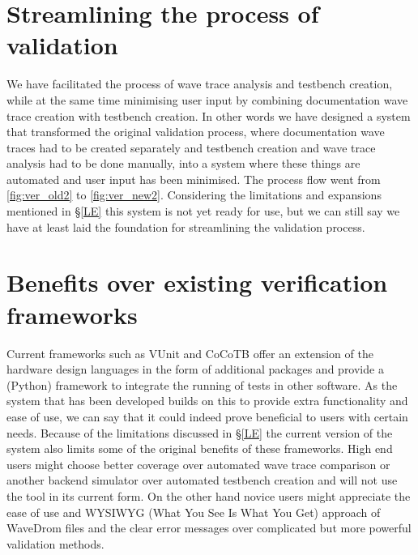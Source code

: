 \section{Streamlining the process of validation}
We have facilitated the process of wave trace analysis and testbench creation, while at the same time minimising user input by combining documentation wave trace creation with testbench creation. In other words we have designed a system that transformed the original validation process, where documentation wave traces had to be created separately and testbench creation and wave trace analysis had to be done manually, into a system where these things are automated and user input has been minimised. The process flow went from \ref{fig:ver_old2} to \ref{fig:ver_new2}.
\npar
Considering the limitations and expansions mentioned in §\ref{LE} this system is not yet ready for use, but we can still say we have at least laid the foundation for streamlining the validation process.\newpage%
%
\npar
{}%
\restoregeometry
\section{Benefits over existing verification frameworks}
Current frameworks such as VUnit and CoCoTB offer an extension of the hardware design languages in the form of additional packages and provide a (Python) framework to integrate the running of tests in other software. As the system that has been developed builds on this to provide extra functionality and ease of use, we can say that it could indeed prove beneficial to users with certain needs. Because of the limitations discussed in §\ref{LE} the current version of the system also limits some of the original benefits of these frameworks.
\npar
High end users might choose better coverage over automated wave trace comparison or another backend simulator over automated testbench creation and will not use the tool in its current form. On the other hand novice users might appreciate the ease of use and WYSIWYG (What You See Is What You Get) approach of WaveDrom files and the clear error messages over complicated but more powerful validation methods.
